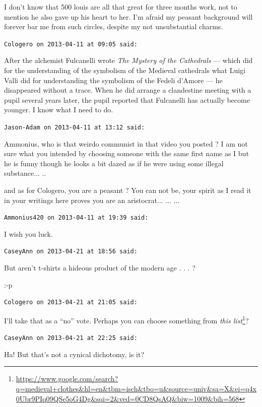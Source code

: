 \begin{footnotesize}
\begin{sffamily}
I don't know that 500 louis are all that great for three months work, not to mention he also gave up his heart to her. I'm afraid my peasant background will forever bar me from such circles, despite my not unsubstantial charms.

\hfill

\texttt{Cologero on 2013-04-11 at 09:05 said:}

After the alchemist Fulcanelli wrote \textit{The Mystery of the Cathedrals} --- which did for the understanding of the symbolism of the Medieval cathedrals what Luigi Valli did for understanding the symbolism of the Fedeli d'Amore --- he disappeared without a trace. When he did arrange a clandestine meeting with a pupil several years later, the pupil reported that Fulcanelli has actually become younger. I know what I need to do.

\hfill

\texttt{Jason-Adam on 2013-04-11 at 13:12 said:}

Ammonius, who is that weirdo communist in that video you posted ? I am not sure what you intended by choosing someone with the same first name as I but he is funny though he looks a bit dazed as if he were using some illegal substance... ..

and as for Cologero, you are a peasant ? You can not be, your spirit as I read it in your writings here proves you are an aristocrat... ... ... 

\hfill

\texttt{Ammonius420 on 2013-04-11 at 19:39 said:}

I wish you luck.

\hfill

\texttt{CaseyAnn on 2013-04-21 at 18:56 said:}

But aren't t-shirts a hideous product of the modern age . . . ?

:-p

\hfill

\texttt{Cologero on 2013-04-21 at 21:05 said:}

I'll take that as a ``no'' vote. Perhaps you can choose something from \textit{this list}\footnote{\url{https://www.google.com/search?q=medieval+clothes\&hl=en\&tbm=isch\&tbo=u\&source=univ\&sa=X\&ei=q4x0Ubr9PIq09QSe5oG4Dg\&sqi=2\&ved=0CD8QsAQ\&biw=1009\&bih=568}}?

\hfill

\texttt{CaseyAnn on 2013-04-21 at 22:25 said:}

Ha! But that's not a cynical dichotomy, is it?


\end{sffamily}
\end{footnotesize}
